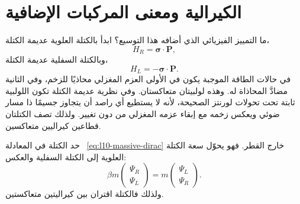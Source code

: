 \section{الكيرالية ومعنى المركبات الإضافية}

ما التمييز الفيزيائي الذي أضافه هذا التوسيع؟ ابدأ بالكتلة العلوية عديمة الكتلة،
\begin{equation}
H_R=\boldsymbol{\sigma}\cdot\mathbf P,
\end{equation}
وبالكتلة السفلية عديمة الكتلة،
\begin{equation}
H_L=-\boldsymbol{\sigma}\cdot\mathbf P.
\end{equation}
في حالات الطاقة الموجبة يكون في الأولى العزم المغزلي محاذيًا للزخم، وفي الثانية مضادَّ المحاذاة له. وهذه لولبيتان متعاكستان. وفي نظرية عديمة الكتلة تكون اللولبية ثابتة تحت تحولات لورنتز الصحيحة، لأنه لا يستطيع أي راصد أن يتجاوز جسيمًا ذا مسار ضوئي ويعكس زخمه مع إبقاء عزمه المغزلي من دون تغيير. ولذلك تصف الكتلتان قطاعين كيراليين متعاكسين.

\begin{classroomqa}
\end{classroomqa}

حد الكتلة في المعادلة ~\eqref{eq:l10-massive-dirac} خارج القطر. فهو يحوّل سعة الكتلة العلوية إلى الكتلة السفلية والعكس:
\begin{equation}
\beta m
\begin{pmatrix}
\Psi_R\\
\Psi_L
\end{pmatrix}
=
m
\begin{pmatrix}
\Psi_L\\
\Psi_R
\end{pmatrix}.
\end{equation}
ولذلك فالكتلة اقتران بين كيراليتين متعاكستين.

\begin{classroomqa}
\end{classroomqa}


